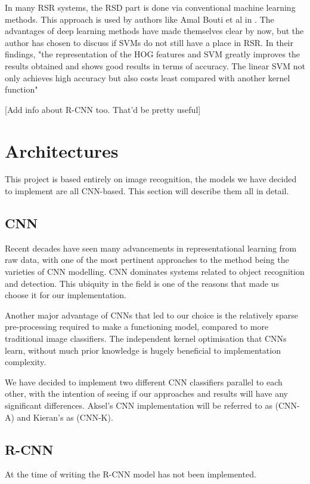 \documentclass[12pt, landscape]{article}
\begin{document}
\begin{multicols}{3}
In many RSR systems, the RSD part is done via conventional machine learning
methods. This approach is used by authors like Amal Bouti et al in
\citep{Recognition1}. The advantages of deep learning methods have made
themselves clear by now, but the author has chosen to discuss if SVMs do not still
have a place in RSR. In their findings, "the representation of the HOG features
and SVM greatly improves the results obtained and shows good results in terms of
accuracy. The linear SVM not only achieves high accuracy but also costs least
compared with another kernel function" \citep[6722 A. Bouti et al]{Recognition1}

[Add info about R-CNN too. That'd be pretty useful]

\section{Architectures}
This project is based entirely on image recognition, the models we have decided
to implement are all CNN-based. This section will describe them all in detail.

\subsection{CNN}
Recent decades have seen many advancements in representational learning from raw
data, with one of the most pertinent approaches to the method being the
varieties of CNN modelling. CNN dominates systems related to object recognition
and detection. This ubiquity in the field is one of the reasons that made us
choose it for our implementation.

Another major advantage of CNNs that led to our choice is the relatively sparse
pre-processing required to make a functioning model, compared to more
traditional image classifiers. The independent kernel optimisation that CNNs
learn, without much prior knowledge is hugely beneficial to implementation
complexity.

We have decided to implement two different CNN classifiers parallel to
each other, with the intention of seeing if our approaches and results will have
any significant differences. Aksel's CNN implementation will be referred to as
(CNN-A) and Kieran's as (CNN-K).

\subsection{R-CNN}
At the time of writing the R-CNN model has not been implemented.


\end{multicols}
\end{document}
